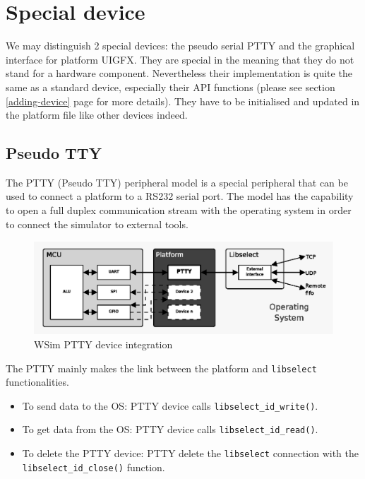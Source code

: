 \documentclass[a4paper,10pt]{report}
\begin{document}
\section{Special device}

We may distinguish 2 special devices: the pseudo serial PTTY and the graphical interface for platform UIGFX. They are special in the meaning that they do not stand for a hardware component. Nevertheless their implementation is quite the same as a standard device, especially their API functions (please see section \ref{adding-device} page \pageref{adding-device} for more details). They have to be initialised and updated in the platform file like other devices indeed.

\subsection{Pseudo TTY}
The PTTY (Pseudo TTY) peripheral model is a special peripheral that can be used to connect a platform to a RS232 serial port. The model has the capability to open a full duplex communication stream with the operating system in order to connect the simulator to external tools.

\begin{figure}[!h]
\begin{center}
  \includegraphics[scale=1]{figures/wsim_ptty.eps}
\end{center}
\caption{WSim PTTY device integration}
\label{wsim-ptty}
\end{figure}

The PTTY mainly makes the link between the platform and \verb$libselect$ functionalities.
\begin{itemize}
  \item To send data to the OS: PTTY device calls \verb$libselect_id_write()$.
  \item To get data from the OS: PTTY device calls \verb$libselect_id_read()$.
  \item To delete the PTTY device: PTTY delete the \verb$libselect$ connection with the \verb$libselect_id_close()$ function.
\end{itemize}
\end{document}
